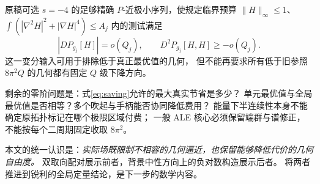 \documentclass[UTF8,11pt,a4paper,fontset=none]{ctexart}
\numberwithin{equation}{section}
\theoremstyle{definition}
\theoremstyle{remark}\newtheorem{remark}[theorem]{说明}
\begin{document}
原稿可选 $s=-4$ 的足够精确 $P$-近极小序列，使规定临界预算
$\|H\|_\infty\le1$、$\int(|\nabla^2H|^2+|\nabla H|^4)\le A_j$
内的测试满足
\[
|DP_{g_j}[H]|=o(Q_j),\qquad D^2P_{g_j}[H,H]\ge-o(Q_j).
\]
这一变分输入\cite{Variational}可用于排除低于真正最优值的几何，
但不能再要求所有低于旧参照 $8\pi^2Q$ 的几何都有固定 $Q$ 级下降方向。

剩余的零阶问题是：式\eqref{eq:saving}允许的最大真实节省是多少？
单元最优值与全局最优值是否相等？多个吹起与手柄能否协同降低费用？
能量下半连续性本身不能确定原拓扑标记在哪个极限区域付费；
一般 ALE 核心必须保留端群与谱修正，不能按每个二周期固定收取 $8\pi^2$。

本文的统一认识是：\emph{实际场既限制不相容的几何逼近，也保留能够降低代价的几何自由度。}
双取向配对展示前者，背景中性方向上的负对数构造展示后者。
将两者推进到锐利的全局定量结论，是下一步的数学内容。
\end{document}
